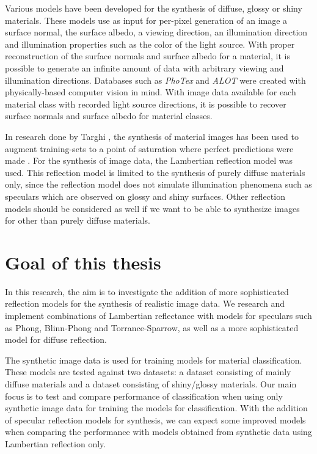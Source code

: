 Various models have been developed for the synthesis of diffuse, glossy or shiny materials. These models use as input for per-pixel generation of an image a surface normal, the surface albedo, a viewing direction, an illumination direction and illumination properties such as the color of the light source. With proper reconstruction of the surface normals and surface albedo for a material, it is possible to generate an infinite amount of data with arbitrary viewing and illumination directions. Databases such as {\it PhoTex} and {\it ALOT} were created with physically-based computer vision in mind. With image data available for each material class with recorded light source directions, it is possible to recover surface normals and surface albedo for material classes. 

In research done by Targhi \cite{Targhi}, the synthesis of material images has been used to augment training-sets to a point of saturation where perfect predictions were made \cite{Targhi}. For the synthesis of image data, the Lambertian reflection model was used. This reflection model is limited to the synthesis of purely diffuse materials only, since the reflection model does not simulate illumination phenomena such as speculars which are observed on glossy and shiny surfaces. Other reflection models should be considered as well if we want to be able to synthesize images for other than purely diffuse materials.

\section{Goal of this thesis}
In this research, the aim is to investigate the addition of more sophisticated reflection models for the synthesis of realistic image data. We research and implement combinations of Lambertian reflectance with models for speculars such as Phong, Blinn-Phong and Torrance-Sparrow, as well as a more sophisticated model for diffuse reflection. 

The synthetic image data is used for training models for material classification. These models are tested against two datasets: a dataset consisting of mainly diffuse materials and a dataset consisting of shiny/glossy materials. Our main focus is to test and compare performance of classification when using only synthetic image data for training the models for classification. With the addition of specular reflection models for synthesis, we can expect some improved models when comparing the performance with models obtained from synthetic data using Lambertian reflection only.

